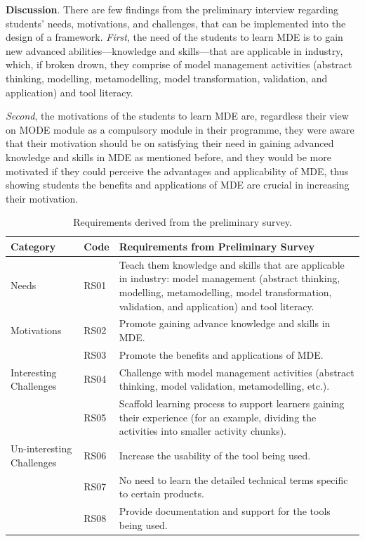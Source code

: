 \documentclass[12pt, a4paper]{report} \usepackage[titletoc]{appendix}
\begin{document}
\begin{appendices}
\textbf{Discussion}. There are few findings from the preliminary interview regarding students' needs, motivations, and challenges, that can be implemented into the design of a framework. \textit{First}, the need of the students to learn MDE is to gain new advanced abilities---knowledge and skills---that are applicable in industry, which, if broken drown, they comprise of model management activities (abstract thinking, modelling, metamodelling, model transformation, validation, and application) and tool literacy. 

\textit{Second}, the motivations of the students to learn MDE are, regardless their view on MODE module as a compulsory module in their programme, they were aware that their motivation should be on satisfying their need in gaining advanced knowledge and skills in MDE as mentioned before, and they would be more motivated if they could perceive the advantages and applicability of MDE, thus showing students the benefits and applications of MDE are crucial in increasing their motivation.

\begin{table}[ht]
\caption{Requirements derived from the preliminary survey.}
\label{table:preliminary-survey}
\begin{center}
\begin{tabular}{ p{2cm}p{1cm}p{10cm} } 
\hline
Category & Code & Requirements from Preliminary Survey \\
\hline
\multirow{1}{2cm}{Needs} 
& RS01 & Teach them knowledge and skills that are applicable in industry: model management (abstract thinking, modelling, metamodelling, model transformation, validation, and application) and tool literacy. \\ 
\hline
\multirow{1}{2cm}{Motivations}
& RS02 & Promote gaining advance knowledge and skills in MDE. \\ 
& RS03 & Promote the benefits and applications of MDE. \\ 
\hline
\multirow{1}{2cm}{Interesting Challenges}
& RS04 & Challenge with model management activities (abstract thinking, model validation, metamodelling, etc.). \\ 
& RS05 & Scaffold learning process to support learners gaining their experience (for an example, dividing the activities into smaller activity chunks). \\ 
\hline
\multirow{1}{2cm}{Un-interesting Challenges}
& RS06 & Increase the usability of the tool being used. \\ 
& RS07 & No need to learn the detailed technical terms specific to certain products. \\ 
& RS08 & Provide documentation and support for the tools being used. \\ 
\hline
\end{tabular}
\end{center}
\end{table}


\end{appendices}
\end{document}
